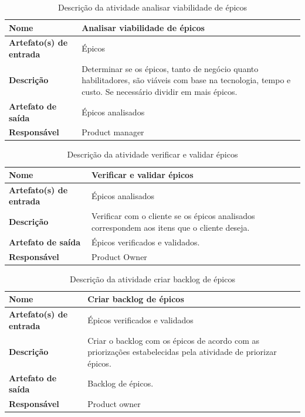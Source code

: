 \begin{table}[H]
    \centering
    \label{descricaoAtividades4}
    \caption{Descrição da atividade analisar viabilidade de épicos}
        \begin{tabular}{|l|p{10cm}|}
        \hline
        \textbf{Nome} & Analisar viabilidade de épicos \\
        \hline
        \textbf{Artefato(s) de entrada} & Épicos \\
        \hline
        \textbf{Descrição} & Determinar se os épicos, tanto de negócio quanto habilitadores, são viáveis com base na tecnologia, tempo e custo. Se necessário dividir em mais épicos. \\
        \hline
        \textbf{Artefato de saída} & Épicos analisados \\
        \hline
        \textbf{Responsável} & Product manager \\
        \hline
    \end{tabular}
\end{table}

\begin{table}[H]
    \centering
    \label{descricaoAtividades5}
    \caption{Descrição da atividade verificar e validar épicos}
        \begin{tabular}{|l|p{10cm}|}
        \hline
        \textbf{Nome} & Verificar e validar épicos \\
        \hline
        \textbf{Artefato(s) de entrada} & Épicos analisados \\
        \hline
        \textbf{Descrição} & Verificar com o cliente se os épicos analisados correspondem aos itens que o cliente deseja. \\
        \hline
        \textbf{Artefato de saída} & Épicos verificados e validados. \\
        \hline
        \textbf{Responsável} & Product Owner \\
            \hline
        \end{tabular}
    \end{table}

    \begin{table}[H]
        \centering
        \label{descricaoAtividades6}
        \caption{Descrição da atividade criar backlog de épicos}
            \begin{tabular}{|l|p{10cm}|}
            \hline
            \textbf{Nome} & Criar backlog de épicos \\
            \hline
            \textbf{Artefato(s) de entrada} & Épicos verificados e validados \\
            \hline
            \textbf{Descrição} & Criar o backlog com os épicos de acordo com as priorizações estabelecidas pela atividade de priorizar épicos. \\
            \hline
            \textbf{Artefato de saída} & Backlog de épicos. \\
            \hline
            \textbf{Responsável} & Product owner \\
            \hline
        \end{tabular}
    \end{table}

